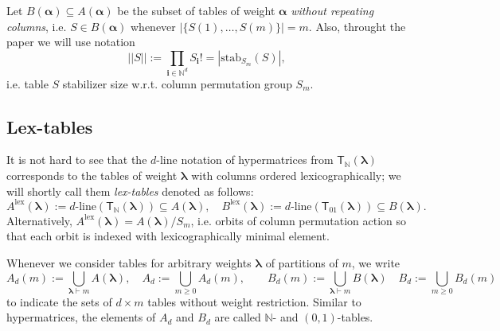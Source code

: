 \documentclass[12pt, reqno]{amsart}
\theoremstyle{definition}
\begin{document}
Let $B(\pmb{\alpha}) \subseteq A(\pmb{\alpha})$ be the subset of tables of weight $\pmb{\alpha}$ \textit{without repeating columns}, i.e. $S \in B(\pmb{\alpha})$ whenever $|\{S(1),\ldots, S(m)\}| = m$. Also, throught the paper we will use notation
$$
    ||S|| := \prod_{\mathbf{i} \in \mathbb{N}^d} S_{\mathbf{i}}! = |\mathrm{stab}_{S_m}(S)|,
$$
i.e. table $S$ stabilizer size w.r.t. column permutation group $S_m$.

\subsection{Lex-tables}
It is not hard to see that the $d$-line notation of hypermatrices from $\mathsf{T}_\mathbb{N}(\pmb{\lambda})$ corresponds to the tables of weight $\pmb{\lambda}$ with columns ordered lexicographically; we will shortly call them \textit{lex-tables} denoted as follows:
$$
    A^\mathrm{lex}(\pmb{\lambda}) := d\text{-line}(\mathsf{T}_\mathbb{N}(\pmb{\lambda})) \subseteq A(\pmb{\lambda}), 
    \quad 
    B^\mathrm{lex}(\pmb{\lambda}) :=  d\text{-line}(\mathsf{T}_{01}(\pmb{\lambda})) \subseteq B(\pmb{\lambda}).
$$
Alternatively, $A^\mathrm{lex}(\pmb{\lambda}) = A(\pmb{\lambda}) / S_m$, i.e. orbits of column permutation action so that each orbit is indexed with lexicographically minimal element.

Whenever we consider tables for arbitrary weights $\pmb{\lambda}$ of partitions of $m$, we write 
$$
    A_d(m) := \bigcup_{\pmb{\lambda} \vdash m} A(\pmb{\lambda}), \quad
    A_d := \bigcup_{m \ge 0} A_d(m), \qquad
    B_d(m) := \bigcup_{\pmb{\lambda} \vdash m} B(\pmb{\lambda}) \quad
    B_d := \bigcup_{m \ge 0} B_d(m)
$$
to indicate the sets of $d \times m$ tables without weight restriction. Similar to hypermatrices, the elements of $A_d$ and $B_d$ are called $\mathbb{N}$- and $(0,1)$-tables.
\end{document}
